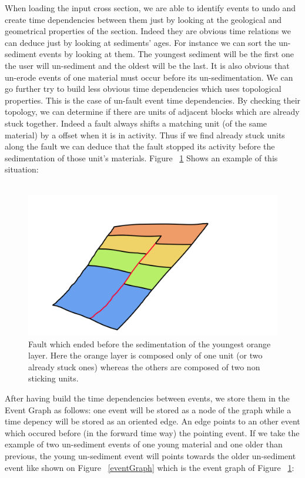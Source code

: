 \documentclass[12pt, a4paper]{report} %
\begin{document}
When loading the input cross section, we are able to identify events to undo and create time dependencies between them just by looking at the geological and geometrical properties of the section. Indeed they are obvious time relations we can deduce just by looking at sediments' ages. For instance we can sort the un-sediment events by looking at them. The youngest sediment will be the first one the user will un-sediment and the oldest will be the last. It is also obvious that un-erode events of one material must occur before its un-sedimentation. 
We can go further try to build less obvious time dependencies which uses topological properties. This is the case of un-fault event time dependencies. By checking their topology, we can determine if there are units of adjacent blocks which are already stuck together. Indeed a fault always shifts a matching unit (of the same material) by a offset when it is in activity. Thus if we find already stuck units along the fault we can deduce that the fault stopped its activity before the sedimentation of those unit's materials. Figure ~\ref{faultstick} Shows an example of this situation:\\\\
	\begin{figure}[H]
	\centering
	\includegraphics[scale=0.5]{unFaultSedDescription.png}
	\caption{Fault which ended before the sedimentation of the youngest orange layer. Here the orange layer is composed only of one unit (or two already stuck ones) whereas the others are composed of two non sticking units.}
	\label{faultstick}
	\end{figure}
	
After having build the time dependencies between events, we store them in the Event Graph as follows:
one event will be stored as a node of the graph while a time depency will be stored as an oriented edge. An edge points to an other event which occured before (in the forward time way) the pointing event. If we take the example of two un-sediment events of one young material and one older than previous, the young un-sediment event will points towards the older un-sediment event like shown on Figure ~\ref{eventGraph} which is the event graph of Figure ~\ref{faultstick}:
\end{document}
